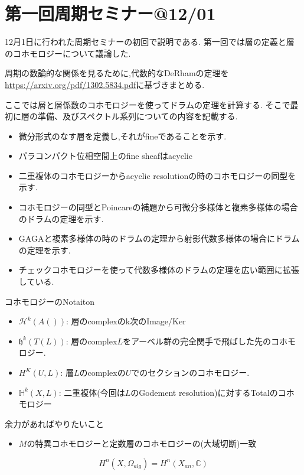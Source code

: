 \chapter{第一回周期セミナー@12/01}
12月1日に行われた周期セミナーの初回で説明である.
第一回では層の定義と層のコホモロジーについて議論した.

周期の数論的な関係を見るために,代数的なDeRhamの定理を\url{https://arxiv.org/pdf/1302.5834.pdf}に基づきまとめる.

ここでは層と層係数のコホモロジーを使ってドラムの定理を計算する.
そこで最初に層の準備、及びスペクトル系列についての内容を記載する.

\begin{itemize}
  \item 微分形式のなす層を定義し,それがfineであることを示す.
  \item パラコンパクト位相空間上のfine sheafはacyclic
  \item 二重複体のコホモロジーからacyclic resolutionの時のコホモロジーの同型を示す.
  \item コホモロジーの同型とPoincareの補題から可微分多様体と複素多様体の場合のドラムの定理を示す.
  \item GAGAと複素多様体の時のドラムの定理から射影代数多様体の場合にドラムの定理を示す.
  \item チェックコホモロジーを使って代数多様体のドラムの定理を広い範囲に拡張している.
\end{itemize}

コホモロジーのNotaiton
\begin{itemize}
  \item $\mathcal{H}^k(A())$: 層のcomplexのk次のImage/Ker
  \item $\mathfrak{h}^k(T(L))$: 層のcomplex$L$をアーベル群の完全関手で飛ばした先のコホモロジー.
  \item $H^K(U,L)$: 層$L$のcomplexの$U$でのセクションのコホモロジー.
  \item $\mathbb{H}^k(X, L)$: 二重複体(今回は$L$のGodement resolution)に対するTotalのコホモロジー
\end{itemize}
余力があればやりたいこと
\begin{itemize}
  \item $M$の特異コホモロジーと定数層のコホモロジーの(大域切断)一致
\end{itemize}

\begin{thm}
\begin{equation*}
H^n(X,\Omega_{alg}) = H^n(X_{an},\mathbb{C})
\end{equation*}
\end{thm}


